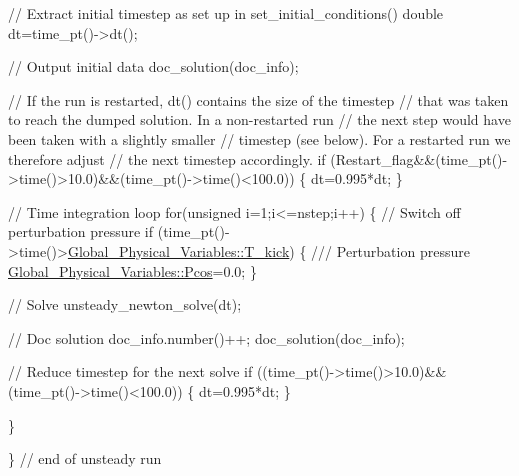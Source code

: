 \begin{DoxyCodeInclude}

 \textcolor{comment}{// Extract initial timestep as set up in set\_initial\_conditions()}
 \textcolor{keywordtype}{double} dt=time\_pt()->dt();

 \textcolor{comment}{// Output initial data}
 doc\_solution(doc\_info);
 
 \textcolor{comment}{// If the run is restarted, dt() contains the size of the timestep}
 \textcolor{comment}{// that was taken to reach the dumped solution. In a non-restarted run}
 \textcolor{comment}{// the next step would have been taken with a slightly smaller }
 \textcolor{comment}{// timestep (see below). For a restarted run we therefore adjust }
 \textcolor{comment}{// the next timestep accordingly.}
 \textcolor{keywordflow}{if} (Restart\_flag&&(time\_pt()->time()>10.0)&&(time\_pt()->time()<100.0))
  \{
   dt=0.995*dt;
  \}

 \textcolor{comment}{// Time integration loop}
 \textcolor{keywordflow}{for}(\textcolor{keywordtype}{unsigned} i=1;i<=nstep;i++)
  \{
   \textcolor{comment}{// Switch off perturbation pressure }
   \textcolor{keywordflow}{if} (time\_pt()->time()>\hyperlink{namespaceGlobal__Physical__Variables_a8a2c0589daf61085e7ebec410cbbbc76}{Global\_Physical\_Variables::T\_kick}) 
     \{\textcolor{comment}{}
\textcolor{comment}{      /// Perturbation pressure}
\textcolor{comment}{}      \hyperlink{namespaceGlobal__Physical__Variables_ab55734aaa66260cd9d4bf68a4ecafdd5}{Global\_Physical\_Variables::Pcos}=0.0; 
     \}
   
   \textcolor{comment}{// Solve}
   unsteady\_newton\_solve(dt);
   
   \textcolor{comment}{// Doc solution}
   doc\_info.number()++;
   doc\_solution(doc\_info);
   
   \textcolor{comment}{// Reduce timestep for the next solve}
   \textcolor{keywordflow}{if} ((time\_pt()->time()>10.0)&&(time\_pt()->time()<100.0))
    \{
     dt=0.995*dt;
    \}

  \}
 
\} \textcolor{comment}{// end of unsteady run}

\end{DoxyCodeInclude}




 

